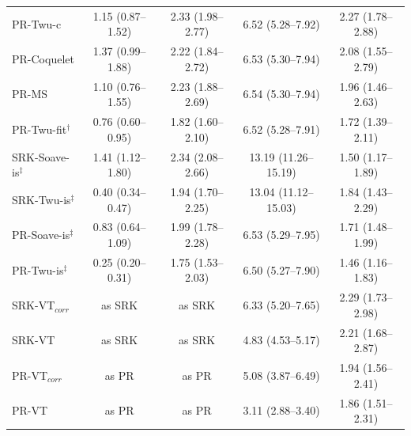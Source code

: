 \begin{table}[H]
\begin{tabular}{lcccc}
PR-Twu-c & 1.15 (0.87--1.52) & 2.33 (1.98--2.77) & 6.52 (5.28--7.92) & 2.27 (1.78--2.88) \\
PR-Coquelet & 1.37 (0.99--1.88) & 2.22 (1.84--2.72) & 6.53 (5.30--7.94) & 2.08 (1.55--2.79) \\
PR-MS & 1.10 (0.76--1.55) & 2.23 (1.88--2.69) & 6.54 (5.30--7.94) & 1.96 (1.46--2.63) \\
PR-Twu-fit$^{\dagger}$ & 0.76 (0.60--0.95) & 1.82 (1.60--2.10) & 6.52 (5.28--7.91) & 1.72 (1.39--2.11) \\
\midrule
SRK-Soave-is$^{\ddagger}$ & 1.41 (1.12--1.80) & 2.34 (2.08--2.66) & 13.19 (11.26--15.19) & 1.50 (1.17--1.89) \\
SRK-Twu-is$^{\ddagger}$ & 0.40 (0.34--0.47) & 1.94 (1.70--2.25) & 13.04 (11.12--15.03) & 1.84 (1.43--2.29) \\
PR-Soave-is$^{\ddagger}$ & 0.83 (0.64--1.09) & 1.99 (1.78--2.28) & 6.53 (5.29--7.95) & 1.71 (1.48--1.99) \\
PR-Twu-is$^{\ddagger}$ & 0.25 (0.20--0.31) & 1.75 (1.53--2.03) & 6.50 (5.27--7.90) & 1.46 (1.16--1.83) \\
\midrule
SRK-VT$_{corr}$ & as SRK & as SRK & 6.33 (5.20--7.65) & 2.29 (1.73--2.98) \\
SRK-VT & as SRK & as SRK & 4.83 (4.53--5.17) & 2.21 (1.68--2.87) \\
PR-VT$_{corr}$ & as PR & as PR & 5.08 (3.87--6.49) & 1.94 (1.56--2.41) \\
PR-VT & as PR & as PR & 3.11 (2.88--3.40) & 1.86 (1.51--2.31) \\
\bottomrule
\end{tabular}
\end{table}

